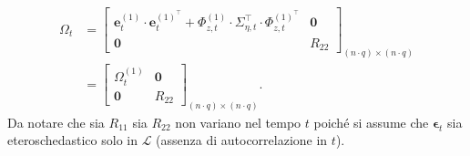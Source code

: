 \begin{equation}
	\begin{split}
		\Omega_t & = \begin{bmatrix}
			\mathbf{e}_t^{(1)}\cdot\mathbf{e}_t^{(1)^\top} + \Phi_{z, t}^{(1)}\cdot\Sigma_{\eta, t}^\top\cdot\Phi_{z, t}^{(1)^\top} & \mathbf{0} \\
			\mathbf{0} & R_{22}
		\end{bmatrix}_{(n\cdot q)\times(n\cdot q)} \\
	 & = \begin{bmatrix}
	 	\Omega_t^{(1)} & \mathbf{0} \\
	 	\mathbf{0} & R_{22}
	 \end{bmatrix}_{(n\cdot q)\times(n\cdot q)}.
	\end{split}
\end{equation}
Da notare che sia $R_{11}$ sia $R_{22}$ non variano nel tempo $t$ poiché si assume che $\boldsymbol{\epsilon}_t$ sia eteroschedastico solo in $\mathcal{L}$ (assenza di autocorrelazione in $t$).